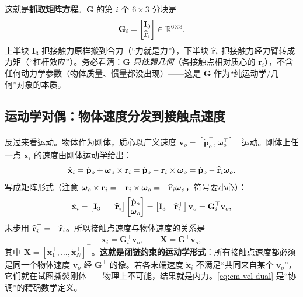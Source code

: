 这就是\textbf{抓取矩阵方程}。$\mathbf{G}$ 的第 $i$ 个 $6\times 3$ 分块是
\begin{equation}
  \mathbf{G}_i=\begin{bmatrix}\mathbf{I}_3\\ \widehat{\mathbf{r}}_i\end{bmatrix}\in\mathbb{R}^{6\times 3},
  \label{eq:cm-Gi}
\end{equation}
上半块 $\mathbf{I}_3$ 把接触力原样搬到合力（“力就是力”），下半块 $\widehat{\mathbf{r}}_i$ 把接触力经力臂转成力矩（“杠杆效应”）。务必看清：$\mathbf{G}$ \emph{只依赖几何}（各接触点相对质心的 $\mathbf{r}_i$），不含任何动力学参数（物体质量、惯量都没出现）——这是 $\mathbf{G}$ 作为“纯运动学/几何”对象的本质。

\subsection{运动学对偶：物体速度分发到接触点速度}
\label{sec:cm-grasp-kin}
反过来看运动。物体作为刚体，质心以广义速度 $\mathbf{v}_o=[\dot{\mathbf{p}}_o^\top,\boldsymbol{\omega}_o^\top]^\top$ 运动。刚体上任一点 $\mathbf{x}_i$ 的速度由刚体运动学给出：
\begin{equation}
  \dot{\mathbf{x}}_i=\dot{\mathbf{p}}_o+\boldsymbol{\omega}_o\times\mathbf{r}_i=\dot{\mathbf{p}}_o-\mathbf{r}_i\times\boldsymbol{\omega}_o=\dot{\mathbf{p}}_o-\widehat{\mathbf{r}}_i\boldsymbol{\omega}_o.
  \label{eq:cm-pt-vel}
\end{equation}
写成矩阵形式（注意 $\boldsymbol{\omega}_o\times\mathbf{r}_i=-\mathbf{r}_i\times\boldsymbol{\omega}_o=-\widehat{\mathbf{r}}_i\boldsymbol{\omega}_o$，符号要小心）：
\begin{equation}
  \dot{\mathbf{x}}_i=\begin{bmatrix}\mathbf{I}_3&-\widehat{\mathbf{r}}_i\end{bmatrix}\begin{bmatrix}\dot{\mathbf{p}}_o\\ \boldsymbol{\omega}_o\end{bmatrix}
  =\begin{bmatrix}\mathbf{I}_3&\widehat{\mathbf{r}}_i^\top\end{bmatrix}\mathbf{v}_o=\mathbf{G}_i^\top\mathbf{v}_o,
  \label{eq:cm-vel-dual-step}
\end{equation}
末步用 $\widehat{\mathbf{r}}_i^\top=-\widehat{\mathbf{r}}_i$。所以接触点速度与物体速度的关系是
\begin{equation}
\boxed{\;\dot{\mathbf{x}}_i=\mathbf{G}_i^\top\mathbf{v}_o,\qquad \dot{\mathbf{X}}=\mathbf{G}^\top\mathbf{v}_o,\;}
  \label{eq:cm-vel-dual}
\end{equation}
其中 $\dot{\mathbf{X}}=[\dot{\mathbf{x}}_1^\top,\dots,\dot{\mathbf{x}}_N^\top]^\top$。\textbf{这就是闭链约束的运动学形式}：所有接触点速度都必须是同一个物体速度 $\mathbf{v}_o$ 经 $\mathbf{G}^\top$ 的像。若各末端速度 $\dot{\mathbf{x}}_i$ 不满足“共同来自某个 $\mathbf{v}_o$”，它们就在试图撕裂刚体——物理上不可能，结果就是内力。\cref{eq:cm-vel-dual} 是“协调”的精确数学定义。

